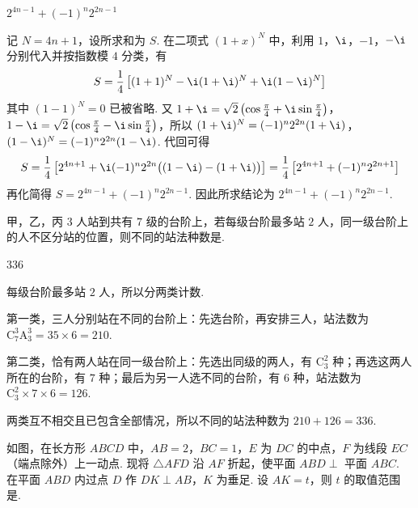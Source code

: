 \begin{answer}
\(2^{4n-1}+(-1)^n2^{2n-1}\)
\end{answer}

\begin{solution}
记 \(N=4n+1\)，设所求和为 \(S\). 在二项式 \((1+x)^N\) 中，利用 \(1\)，\(\i\)，\(-1\)，\(-\i\) 分别代入并按指数模 \(4\) 分类，有
\[
S=\frac14\left[(1+1)^N-\i(1+\i)^N+\i(1-\i)^N\right]
\]
其中 \((1-1)^N=0\) 已被省略. 又
\(1+\i=\sqrt2\left(\cos\frac\pi4+\i\sin\frac\pi4\right)\)，
\(1-\i=\sqrt2\left(\cos\frac\pi4-\i\sin\frac\pi4\right)\)，所以
\((1+\i)^N=(-1)^n2^{2n}(1+\i)\)，
\((1-\i)^N=(-1)^n2^{2n}(1-\i)\).
代回可得
\[
S=\frac14\left[2^{4n+1}+\i(-1)^n2^{2n}\bigl((1-\i)-(1+\i)\bigr)\right]
=\frac14\left[2^{4n+1}+(-1)^n2^{2n+1}\right]
\]
再化简得 \(S=2^{4n-1}+(-1)^n2^{2n-1}\).
因此所求结论为 \(2^{4n-1}+(-1)^n2^{2n-1}\).
\end{solution}

\begin{problem}
甲，乙，丙 \(3\) 人站到共有 \(7\) 级的台阶上，若每级台阶最多站 \(2\) 人，同一级台阶上的人不区分站的位置，则不同的站法种数是\fillinblank{}.
\end{problem}

\begin{answer}
336
\end{answer}

\begin{solution}
每级台阶最多站 \(2\) 人，所以分两类计数.

第一类，三人分别站在不同的台阶上：先选台阶，再安排三人，站法数为 \(\mathrm C_7^3\mathrm A_3^3=35\times6=210\).

第二类，恰有两人站在同一级台阶上：先选出同级的两人，有 \(\mathrm C_3^2\) 种；再选这两人所在的台阶，有 \(7\) 种；最后为另一人选不同的台阶，有 \(6\) 种，站法数为 \(\mathrm C_3^2\times7\times6=126\).

两类互不相交且已包含全部情况，所以不同的站法种数为 \(210+126=336\).
\end{solution}

\begin{problem}
如图，在长方形 \(ABCD\) 中，\(AB=2\)，\(BC=1\)，\(E\) 为 \(DC\) 的中点，\(F\) 为线段 \(EC\)（端点除外）上一动点. 现将 \(\triangle AFD\) 沿 \(AF\) 折起，使平面 \(ABD\perp\) 平面 \(ABC\). 在平面 \(ABD\) 内过点 \(D\) 作 \(DK\perp AB\)，\(K\) 为垂足. 设 \(AK=t\)，则 \(t\) 的取值范围是\fillinblank{}.

\end{problem}

